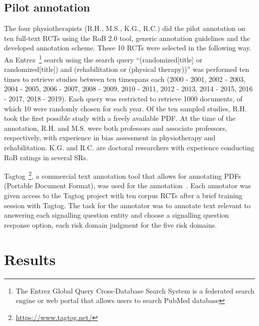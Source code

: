 \documentclass{IOS-Book-Article}
\begin{document}
\subsection{Pilot annotation}
\label{subsec:annotation}
%
The four physiotherapists (R.H., M.S., K.G., R.C.) did the pilot annotation on ten full-text RCTs using the RoB 2.0 tool, generic annotation guidelines and the developed annotation scheme.
These 10 RCTs were selected in the following way.
An Entrez~\footnote{The Entrez Global Query Cross-Database Search System is a federated search engine or web portal that allows users to search PubMed database} search using the search query ``{\selectfont (randomized[title] or randomized[title]) and (rehabilitation or (physical therapy))}'' was performed ten times to retrieve studies between ten timespans each (2000 - 2001, 2002 - 2003, 2004 - 2005, 2006 - 2007, 2008 - 2009, 2010 - 2011, 2012 - 2013, 2014 - 2015, 2016 - 2017, 2018 - 2019).
Each query was restricted to retrieve 1000 documents, of which 10 were randomly chosen for each year.
Of the ten sampled studies, R.H. took the first possible study with a freely available PDF.
At the time of the annotation, R.H. and M.S. were both professors and associate professors, respectively, with experience in bias assessment in physiotherapy and rehabilitation.
K.G. and R.C. are doctoral researchers with experience conducting RoB ratings in several SRs.


Tagtog~\footnote{\url{https://www.tagtog.net/}}, a commercial text annotation tool that allows for annotating PDFs (Portable Document Format), was used for the annotation~\cite{cejuela2014tagtog}.
Each annotator was given access to the Tagtog project with ten corpus RCTs after a brief training session with Tagtog.
The task for the annotator was to annotate text relevant to answering each signalling question entity and choose a signalling question response option, each risk domain judgment for the five risk domains.
%
%
%
\section{Results}
\label{sec:results}
%
\end{document}
